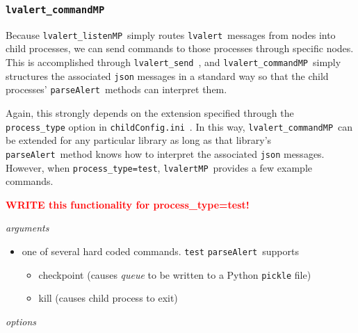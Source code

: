 \documentclass{article}
\newcommand{\FIXME}[1]{\textcolor{red}{\textbf{#1}}}
\newcommand{\alert}{\texttt{lvalert}~}
\newcommand{\lvalertSend}{\texttt{lvalert\_send}~}
\newcommand{\lvalertMP}{\texttt{lvalertMP}~}
\newcommand{\lvalertListenMP}{\texttt{lvalert\_listenMP}~}
\newcommand{\lvalertCommandMP}{\texttt{lvalert\_commandMP}~}
\newcommand{\parseAlert}{\texttt{parseAlert}~}
\newcommand{\childConfigini}{\texttt{childConfig.ini}~}
\begin{document}

\subsubsection{\lvalertCommandMP}
\label{sec: lvalertCommandMP}

Because \lvalertListenMP simply routes \alert messages from nodes into child processes, we can send commands to those processes through specific nodes.
This is accomplished through \lvalertSend, and \lvalertCommandMP simply structures the associated \texttt{json} messages in a standard way so that the child processes' \parseAlert methods can interpret them.

Again, this strongly depends on the extension specified through the \texttt{process\_type} option in \childConfigini. 
In this way, \lvalertCommandMP can be extended for any particular library as long as that library's \parseAlert method knows how to interpret the associated \texttt{json} messages.
However, when \texttt{process\_type=test}, \lvalertMP provides a few example commands.

\FIXME{WRITE this functionality for process\_type=test!}

\vspace{0.5cm}
\noindent
\textit{arguments}

\begin{itemize}
    \item{one of several hard coded commands. \texttt{test} \parseAlert supports
        \begin{itemize}
            \item{checkpoint (causes \textit{queue} to be written to a Python \texttt{pickle} file)}
            \item{kill (causes child process to exit)}
        \end{itemize}
         }
\end{itemize}

\noindent
\textit{options}
\end{document}
